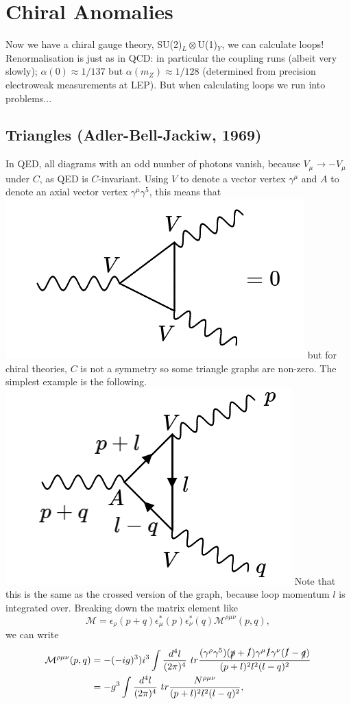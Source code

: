 \section{Chiral Anomalies}
%
Now we have a chiral gauge theory, SU(2)$_L\otimes$U(1)$_Y$, we can calculate loops! Renormalisation is just as in QCD: in particular the coupling runs (albeit very slowly); $\alpha(0) \approx 1/137$ but $\alpha(m_Z) \approx 1/128$ (determined from precision electroweak measurements at LEP). But when calculating loops we run into problems...
%
\subsection{Triangles (Adler-Bell-Jackiw, 1969)}
%
In QED, all diagrams with an odd number of photons vanish, because $V_\mu \to -V_\mu$ under $C$, as QED is $C$-invariant. Using $V$ to denote a vector vertex $\gamma^\mu$ and $A$ to denote an axial vector vertex $\gamma^\mu \gamma^5$, this means that 
\newline
\includegraphics[width=0.4\linewidth]{figs/39a.png}
\newline
but for chiral theories, $C$ is not a symmetry so some triangle graphs are non-zero. The simplest example is the following.
\newline
\includegraphics[width=0.4\linewidth]{figs/39b.png}
\newline
Note that this is the same as the crossed version of the graph, because loop momentum $l$ is integrated over. Breaking down the matrix element like
\begin{equation}
\mathcal{M} = \epsilon_\rho(p+q)\epsilon_\mu^*(p)\epsilon_\nu^*(q)\mathcal{M}^{\rho \mu \nu}(p,q),
\end{equation}
we can write
\begin{equation}
\begin{split}
\mathcal{M}^{\rho \mu \nu}(p,q) &= - (-ig)^3)i^3 \int \frac{d^4l}{(2\pi)^4}\ tr \frac{(\gamma^\rho \gamma^5)(\slashed{p} + \slashed{l})\gamma^\mu \slashed{l} \gamma^\nu (\slashed{l} - \slashed{q})}{(p+l)^2l^2(l-q)^2} \\
&= - g^3 \int \frac{d^4l}{(2\pi)^4}\ tr \frac{N^{\rho \mu \nu}}{(p+l)^2l^2(l-q)^2}, 
\end{split}
\end{equation}
